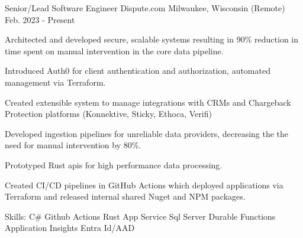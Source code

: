 

\begin{cventries}

  \cventry
    {Senior/Lead Software Engineer} %
    {Dispute.com} %
    {Milwaukee, Wisconsin (Remote)} %
    {Feb. 2023 - Present} %
    {
      \begin{cvitems} %
        \item {Architected and developed secure, scalable systems resulting in 90\% reduction in time spent on 
              manual intervention in the core data pipeline.}
        \item {Introduced Auth0 for client authentication and authorization, automated management via Terraform.}
        \item {Created extensible system to manage integrations with CRMs and Chargeback Protection platforms (Konnektive, Sticky, Ethoca, Verifi)}
        \item {Developed ingestion pipelines for unreliable data providers, decreasing the the need for manual intervention by 80\%.}
        \item {Prototyped Rust apis for high performance data processing.}
        \item {Created CI/CD pipelines in GitHub Actions which deployed applications via Terraform and released internal shared Nuget and NPM packages.}
        \item {Skills: C\# \textbullet{} Github Actions \textbullet{} Rust \textbullet{} App Service \textbullet{} Sql Server \textbullet{} Durable Functions \textbullet{} Application Insights \textbullet{} Entra Id/AAD}
      \end{cvitems}
    }


\end{cventries}
